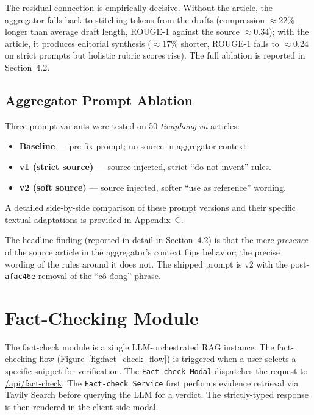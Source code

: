 The residual connection is empirically decisive. Without the article,
the aggregator falls back to stitching tokens from the drafts (compression
$\approx 22\%$ longer than average draft length, ROUGE-1 against the
source $\approx 0.34$); with the article, it produces editorial
synthesis ($\approx 17\%$ shorter, ROUGE-1 falls to $\approx 0.24$ on
strict prompts but holistic rubric scores rise). The full ablation is
reported in Section~4.2.

\subsection{Aggregator Prompt Ablation}

Three prompt variants were tested on 50 \textit{tienphong.vn} articles:

\begin{itemize}
  \item \textbf{Baseline} --- pre-fix prompt; no source in aggregator
        context.
  \item \textbf{v1 (strict source)} --- source injected, strict
        ``do not invent'' rules.
  \item \textbf{v2 (soft source)} --- source injected, softer
        ``use as reference'' wording.
\end{itemize}

A detailed side-by-side comparison of these prompt versions and their specific textual adaptations is provided in Appendix~C.

The headline finding (reported in detail in Section~4.2) is that the
mere \textit{presence} of the source article in the aggregator's context
flips behavior; the precise wording of the rules around it does not.
The shipped prompt is v2 with the post-\texttt{afac46e} removal of the
``cô đọng'' phrase.

\section{Fact-Checking Module}

The fact-check module is a single LLM-orchestrated RAG instance. The 
fact-checking flow (Figure~\ref{fig:fact_check_flow}) is triggered when a
user selects a specific snippet for verification. The \texttt{Fact-check Modal}
dispatches the request to \url{/api/fact-check}. The \texttt{Fact-check Service}
first performs evidence retrieval via Tavily Search before querying the LLM
for a verdict. The strictly-typed response is then rendered in the client-side
modal.

